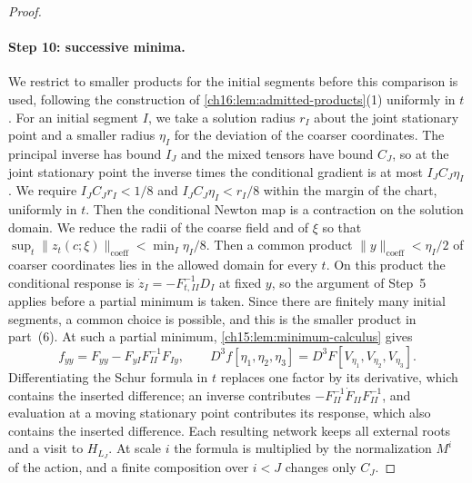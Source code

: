 \begin{proof}
\paragraph{Step 10: successive minima.}
We restrict to smaller products for the initial segments before this comparison is used, following the construction of \cref{ch16:lem:admitted-products}(1) uniformly in $t$. For an initial segment $I$, we take a solution radius $r_I$ about the joint stationary point and a smaller radius $\eta_I$ for the deviation of the coarser coordinates. The principal inverse has bound $I_J$ and the mixed tensors have bound $C_J$, so at the joint stationary point the inverse times the conditional gradient is at most $I_JC_J\eta_I$. We require $I_JC_Jr_I<1/8$ and $I_JC_J\eta_I<r_I/8$ within the margin of the chart, uniformly in $t$. Then the conditional Newton map is a contraction on the solution domain. We reduce the radii of the coarse field and of $\xi$ so that $\sup_t\|z_t(c;\xi)\|_{\mathrm{coeff}}<\min_I\eta_I/8$. Then a common product $\|y\|_{\mathrm{coeff}}<\eta_I/2$ of coarser coordinates lies in the allowed domain for every $t$. On this product the conditional response is $\dot z_I=-F_{t,II}^{-1}D_I$ at fixed $y$, so the argument of Step~5 applies before a partial minimum is taken. Since there are finitely many initial segments, a common choice is possible, and this is the smaller product in part~(6). At such a partial minimum, \cref{ch15:lem:minimum-calculus} gives
\[
 f_{yy}=F_{yy}-F_{yI}F_{II}^{-1}F_{Iy},\qquad
 D^3f[\eta_1,\eta_2,\eta_3]=D^3F[V_{\eta_1},V_{\eta_2},V_{\eta_3}].
\]
Differentiating the Schur formula in $t$ replaces one factor by its derivative, which contains the inserted difference; an inverse contributes $-F_{II}^{-1}\dot F_{II}F_{II}^{-1}$, and evaluation at a moving stationary point contributes its response, which also contains the inserted difference. Each resulting network keeps all external roots and a visit to $H_{L_J}$. At scale $i$ the formula is multiplied by the normalization $M^i$ of the action, and a finite composition over $i<J$ changes only $C_J$.


\end{proof}
